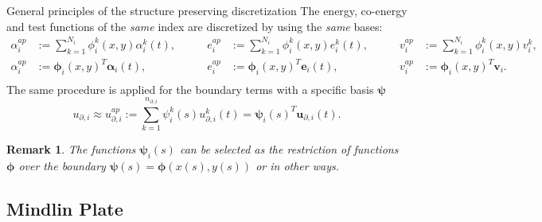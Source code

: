 \documentclass{beamer}
\newtheorem{remark}{Remark}
\begin{document}
\begin{frame}{General principles of the structure preserving discretization}
	The energy, co-energy and test functions of the \textit{same} index are discretized by using the \textit{same} bases:
	\small
	\begin{equation*}
	\begin{aligned}
	\alpha_i^{ap} &:= \sum_{k=1}^{N_i} \phi_i^k(x,y) \alpha_i^k(t),  \\
	\alpha_i^{ap} &:= \bm{\phi}_i(x,y)^T \bm{\alpha}_i(t), \\
	\end{aligned} \qquad 
	\begin{aligned}
	e_i^{ap} &:= \sum_{k=1}^{N_i} \phi_i^k(x,y) e_i^k(t), \\
	e_i^{ap} &:= \bm{\phi}_i(x,y)^T \bm{e}_i(t), \\
	\end{aligned} \qquad 
	\begin{aligned}
	v_i^{ap} &:= \sum_{k=1}^{N_i} \phi_i^k(x,y) v_i^k,  \\
	v_i^{ap} &:= \bm{\phi}_i(x,y)^T \bm{v}_i. \\
	\end{aligned}
	\end{equation*}
	\normalsize
	The same procedure is applied for the boundary terms with a specific basis $\bm\psi$
	\begin{equation*}
	u_{\partial, i} \approx u_{\partial, i}^{ap} := \sum_{k=1}^{n_{\partial, i}} \psi^k_i(s) u_{\partial, i}^k(t) = \bm{\psi}_i(s)^T \bm{u}_{\partial, i}(t).
	\end{equation*}
	
	\begin{remark}
		The functions $\bm{\psi}_i(s)$ can be selected as the restriction of functions $\bm{\phi}$ over the boundary $\bm{\psi}(s) = \bm{\phi}(x(s),y(s))$ or in other ways.
	\end{remark}
	
\end{frame}


\subsection{Mindlin Plate}
\end{document}
